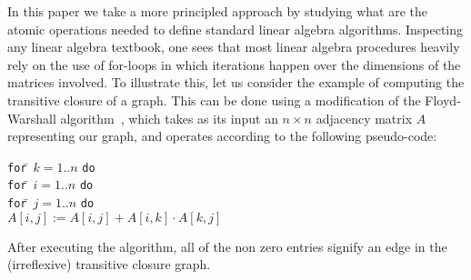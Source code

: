 In this paper we take a more principled approach by studying what are the atomic operations needed to define standard linear algebra algorithms. Inspecting any linear algebra textbook, one sees that most linear algebra procedures heavily rely on the use of for-loops in which iterations happen over the dimensions of the matrices involved. To illustrate this, let us consider the example of computing the transitive closure of a graph. This can be done using a modification of the Floyd-Warshall algorithm~\cite{cormen}, which takes as its input an $n\times n$ adjacency matrix $A$ representing our graph, and operates according to the following pseudo-code:
\begin{tabbing}
\quad\texttt{for}\=\,  $k = 1..n$ \texttt{do}\\
\> \texttt{for}\=\,  $i = 1..n$ \texttt{do}\\
\> \> \texttt{for}\=\,  $j = 1..n$ \texttt{do}\\
\> \> \> $A[i,j] := A[i,j] + A[i,k] \cdot A[k,j]$
\end{tabbing}
After executing the algorithm, all of the non zero entries signify an edge in the (irreflexive) transitive closure graph.
%



